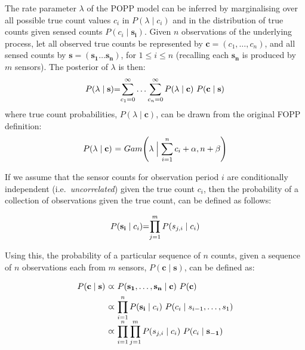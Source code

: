 The rate parameter $\lambda$ of the POPP model can be inferred by marginalising over all possible true count values $c_i$ in $P(\lambda \mid c_i)$ and in the  distribution of true counts given sensed counts $P(c_i \mid \mathbf{s_i})$. 
% 
Given $n$ observations of the underlying process, let all observed true counts be represented by $\mathbf{c} = (c_1, \ldots, c_n)$, and all sensed counts by $\mathbf{s}=(\mathbf{s_1} \dots \mathbf{s_n})$, for $1 \leq i \leq n$ (recalling each $\mathbf{s_n}$ is produced by $m$ sensors). 
% 
The posterior of $\lambda$ is then:
\begin{equation}
	\label{eq:marginal_occurrences}
	\begin{tabular}{r@{=}l}
		$P(\lambda \mid \mathbf{s})$ &  $\displaystyle\sum_{c_1=0}^{\infty} \ldots \displaystyle\sum_{c_n=0}^{\infty} P(\lambda \mid \mathbf{c}) ~ P(\mathbf{c} \mid \mathbf{s})$ \\
	\end{tabular}
\end{equation}
\noindent where true count probabilities, $P(\lambda \mid \mathbf{c})$, can be drawn from the original FOPP definition:
\begin{equation}
	\label{eq:gamma_posterior_fopp}
	\begin{tabular}{r@{ = }l}
		$P(\lambda \mid \mathbf{c})$ & $Gam\Bigg(\lambda \Bigm| \displaystyle\sum_{i=1}^{n} c_i + \alpha, n + \beta \Bigg)$
	\end{tabular}
\end{equation}


If we assume that the sensor counts for observation period $i$ are conditionally independent (i.e.~\textit{uncorrelated}) given the true count $c_i$, then the probability of a collection of observations given the true count, can be defined as follows: 

\begin{equation}
	\label{eq:independent_sensor_likelihood}
	\begin{tabular}{r@{=}l}
	$P(\mathbf{s_i} \mid c_i)$ & $\displaystyle\prod_{j=1}^{m} P(s_{j,i} \mid c_i)$ \\ 
	\end{tabular}
\end{equation}

Using this, the probability of a particular sequence of $n$ counts, given a sequence of $n$ observations each from $m$ sensors, $P(\mathbf{c} \mid \mathbf{s})$, can be defined as:

\begin{equation}
    \label{eq:occurrences_likelihood}
    \begin{tabular}{r@{ $\varpropto$ }l}
        $P(\mathbf{c} \mid \mathbf{s})$ & $P(\mathbf{s_1}, \ldots, \mathbf{s_n} \mid \mathbf{c}) ~ P(\mathbf{c})$ \\ [1ex]
        & $\displaystyle\prod_{i=1}^{n} P(\mathbf{s_i} \mid c_i) ~ P(c_i \mid s_{i-1}, \ldots, s_{1})$ \\ [2ex]
        & $\displaystyle\prod_{i=1}^{n} \displaystyle\prod_{j=1}^{m} P(s_{j,i} \mid c_i) ~ P(c_i \mid \mathbf{s_{-1}})$
    \end{tabular}
\end{equation}

